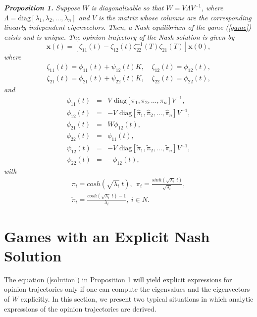 \documentclass[10pt, conference, compsocconf]{IEEEtran}
\begin{document}
{\it \textbf{Proposition 1.} Suppose $W$ is diagonalizable so that $W = V \Lambda V^{-1}$, where $\Lambda = \mbox{diag} \left[\lambda_1, \lambda_2, ... , \lambda_n \right]$ and $V$ is the matrix whose columns are the corresponding linearly independent eigenvectors. Then, a Nash equilibrium of the game (\ref{game}) exists and is unique. The opinion trajectory of the Nash solution is given by
\begin{equation} \label{solution}
\mathbf{x}(t) = \left[ \zeta_{11}(t) - \zeta_{12}(t) \zeta_{22}^{-1}(T) \zeta_{21}(T) \right] \mathbf{x}(0),
\end{equation}
where
\begin{eqnarray*}
\zeta_{11}(t)=\phi_{11}(t) + \psi_{12}(t)K, & \ \zeta_{12}(t) = \phi_{12}(t), \\
\zeta_{21}(t)=\phi_{21}(t) + \psi_{22}(t)K, & \ \zeta_{22}(t) = \phi_{22}(t),
\end{eqnarray*}
and
\begin{eqnarray*}
\phi_{11}(t) &=& V\mbox{ diag}\left[ \pi_1 , \pi_2 , \dots , \pi_n \right]V^{-1}, \\
\phi_{12}(t) &=& -V\mbox{ diag}\left[ \hat{\pi}_1, \hat{\pi}_2, \dots , \hat{\pi}_n \right]V^{-1}, \\
\phi_{21}(t) &=& W\phi_{12}(t), \\
\phi_{22}(t) &=& \phi_{11}(t), \\
\psi_{12}(t) &=& -V\mbox{ diag}\left[ \tilde{\pi}_1, \tilde{\pi}_2, \dots , \tilde{\pi}_n \right]V^{-1}, \\
\psi_{22}(t) &=& -\phi_{12}(t),
\end{eqnarray*}
with
\begin{eqnarray*}
\pi_i = cosh \left( \sqrt{\lambda_i} \ t \right), \ \
\hat{\pi}_i = \frac{sinh \left( \sqrt{\lambda_i} \ t \right)}{\sqrt{\lambda_i}},
\\
\tilde{\pi}_i = \frac{cosh \left( \sqrt{\lambda_i} \ t \right) - 1}{\lambda_i},  \  i\in N.
\end{eqnarray*}
}

\section{Games with an Explicit Nash Solution}

The equation (\ref{solution}) in Proposition 1 will yield explicit expressions for opinion trajectories only if one can compute the eigenvalues and the eigenvectors of $W$ explicitly. In this section, we present two typical situations in which analytic expressions of the opinion trajectories are  derived.
\end{document}
